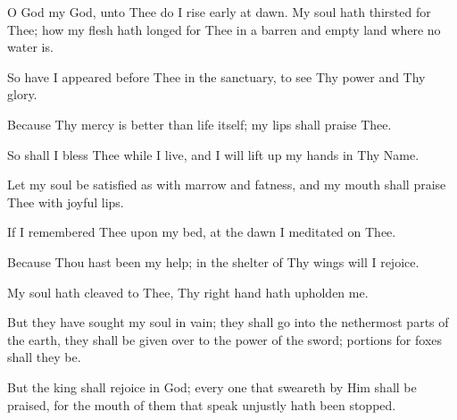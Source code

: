 O God my God, unto Thee do I rise early at dawn. My soul hath thirsted for Thee; how my flesh hath longed for Thee in a barren and empty land where no water is.

So have I appeared before Thee in the sanctuary, to see Thy power and Thy glory.

Because Thy mercy is better than life itself; my lips shall praise Thee.

So shall I bless Thee while I live, and I will lift up my hands in Thy Name.

Let my soul be satisfied as with marrow and fatness, and my mouth shall praise Thee with joyful lips.

If I remembered Thee upon my bed, at the dawn I meditated on Thee.

Because Thou hast been my help; in the shelter of Thy wings will I rejoice.

My soul hath cleaved to Thee, Thy right hand hath upholden me.

But they have sought my soul in vain; they shall go into the nethermost parts of the earth, they shall be given over to the power of the
sword; portions for foxes shall they be.

But the king shall rejoice in God; every one that sweareth by Him shall be praised, for the mouth of them that speak unjustly hath been stopped.
